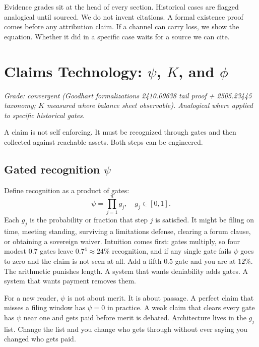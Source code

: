 \documentclass[11pt]{article}
\begin{document}
Evidence grades sit at the head of every section. Historical cases are flagged analogical until sourced. We do not invent citations. A formal existence proof comes before any attribution claim. If a channel can carry loss, we show the equation. Whether it did in a specific case waits for a source we can cite.

\section{Claims Technology: \texorpdfstring{$\psi$}{psi}, \texorpdfstring{$K$}{K}, and \texorpdfstring{$\phi$}{phi}}
\label{sec:claims}

\textit{Grade: convergent (Goodhart formalizations 2410.09638 tail proof + 2505.23445 taxonomy; $K$ measured where balance sheet observable). Analogical where applied to specific historical gates.}

A claim is not self enforcing. It must be recognized through gates and then collected against reachable assets. Both steps can be engineered.

\subsection{Gated recognition \texorpdfstring{$\psi$}{psi}}

Define recognition as a product of gates:
\begin{equation}
\psi = \prod_{j=1}^{n} g_j,\quad g_j \in [0,1].
\label{eq:psi}
\end{equation}
Each $g_j$ is the probability or fraction that step $j$ is satisfied. It might be filing on time, meeting standing, surviving a limitations defense, clearing a forum clause, or obtaining a sovereign waiver. Intuition comes first: gates multiply, so four modest $0.7$ gates leave $0.7^4 \approx 24\%$ recognition, and if any single gate fails $\psi$ goes to zero and the claim is not seen at all. Add a fifth $0.5$ gate and you are at $12\%$. The arithmetic punishes length. A system that wants deniability adds gates. A system that wants payment removes them.

For a new reader, $\psi$ is not about merit. It is about passage. A perfect claim that misses a filing window has $\psi=0$ in practice. A weak claim that clears every gate has $\psi$ near one and gets paid before merit is debated. Architecture lives in the $g_j$ list. Change the list and you change who gets through without ever saying you changed who gets paid.
\end{document}
